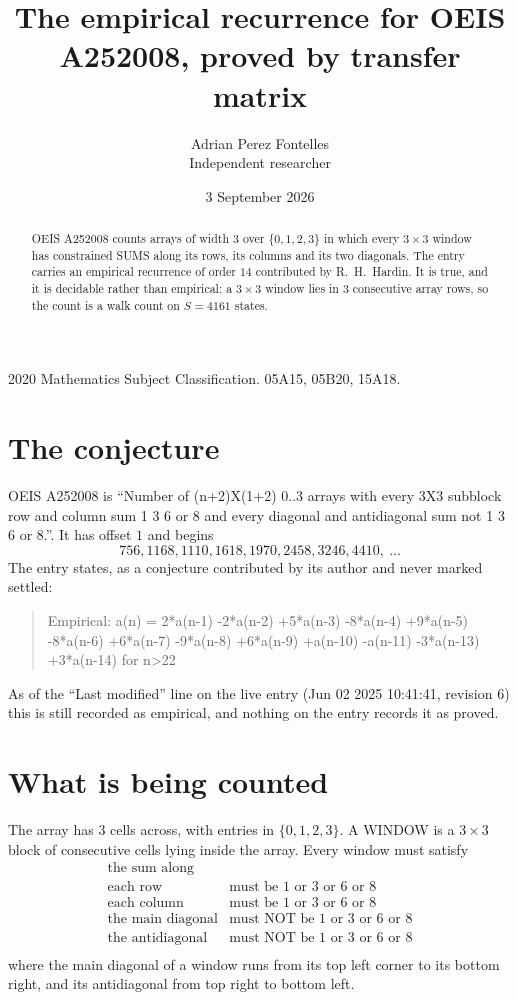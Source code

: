 \documentclass[11pt,a4paper]{article}
\title{The empirical recurrence for OEIS A252008, proved by transfer matrix}
\author{Adrian Perez Fontelles\\ \small Independent researcher}
\date{3 September 2026}
\theoremstyle{plain}
\theoremstyle{definition}
\begin{document}
\maketitle

\begin{abstract}
OEIS A252008 counts arrays of width $3$ over $\{0,1,2,3\}$ in which every $3\times3$ window has
constrained SUMS along its rows, its columns and its two diagonals. The entry carries an
empirical recurrence of order $14$ contributed by R.~H.~Hardin. It is true, and it is
decidable rather than empirical: a $3\times3$ window lies in $3$ consecutive array rows,
so the count is a walk count on $S=4161$ states.
\end{abstract}

\noindent\small 2020 Mathematics Subject Classification. 05A15, 05B20, 15A18.\normalsize

\section{The conjecture}

OEIS A252008 is ``Number of (n+2)X(1+2) 0..3 arrays with every 3X3 subblock row and column sum 1 3 6 or 8 and every diagonal and antidiagonal sum not 1 3 6 or 8.''. It has offset $1$ and begins
\[
756, 1168, 1110, 1618, 1970, 2458, 3246, 4410,\ \dots
\]
The entry states, as a conjecture contributed by its author and never marked settled:
\begin{quote}
Empirical: a(n) = 2*a(n-1) -2*a(n-2) +5*a(n-3) -8*a(n-4) +9*a(n-5) -8*a(n-6) +6*a(n-7) -9*a(n-8) +6*a(n-9) +a(n-10) -a(n-11) -3*a(n-13) +3*a(n-14) for n>22
\end{quote}
As of the ``Last modified'' line on the live entry (Jun 02 2025 10:41:41, revision 6) this is still
recorded as empirical, and nothing on the entry records it as proved.

\section{What is being counted}

The array has $3$ cells across, with entries in $\{0,1,2,3\}$. A WINDOW is a $3\times3$ block
of consecutive cells lying inside the array. Every window must satisfy
\[
\begin{array}{ll}
\text{the sum along} & \text{} \\[2pt]
\text{each row} & \text{must be 1 or 3 or 6 or 8} \\
\text{each column} & \text{must be 1 or 3 or 6 or 8} \\
\text{the main diagonal} & \text{must NOT be 1 or 3 or 6 or 8} \\
\text{the antidiagonal} & \text{must NOT be 1 or 3 or 6 or 8} \\
\end{array}
\]
where the main diagonal of a window runs from its top left corner to its bottom right, and its
antidiagonal from top right to bottom left.
\end{document}
